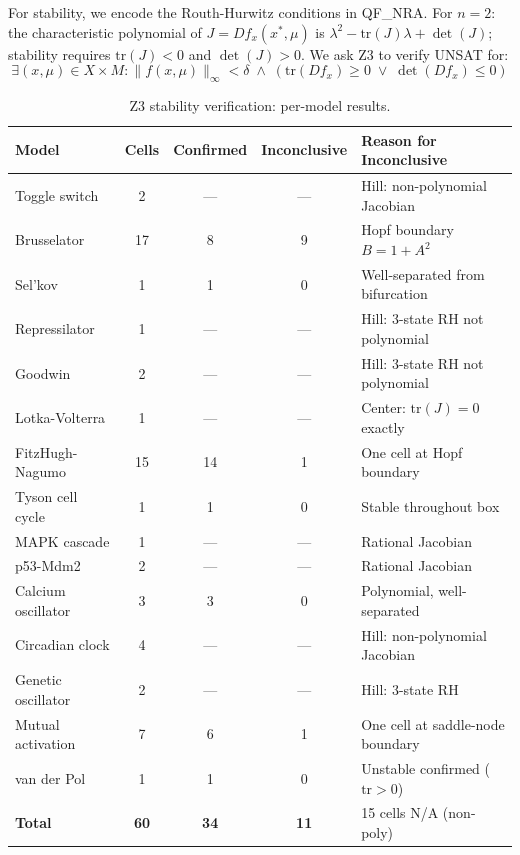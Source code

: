 \documentclass[11pt]{article}
\newcommand{\norm}[1]{\|#1\|}
\begin{document}
For stability, we encode the Routh-Hurwitz conditions in QF\_NRA.
For $n = 2$: the characteristic polynomial of $J = Df_x(x^*, \mu)$ is $\lambda^2 - \mathrm{tr}(J)\lambda + \det(J)$; stability requires $\mathrm{tr}(J) < 0$ and $\det(J) > 0$.
We ask Z3 to verify UNSAT for:
\[
\exists (x, \mu) \in X \times M : \norm{f(x, \mu)}_\infty < \delta \;\wedge\; (\mathrm{tr}(Df_x) \geq 0 \;\lor\; \det(Df_x) \leq 0)
\]

\begin{table}[h]
\centering
\caption{Z3 stability verification: per-model results.}
\label{tab:z3-stability}
\small
\begin{tabular}{@{}lcccl@{}}
\toprule
Model & Cells & Confirmed & Inconclusive & Reason for Inconclusive \\
\midrule
Toggle switch      & 2  & ---  & ---  & Hill: non-polynomial Jacobian \\
Brusselator        & 17 & 8    & 9    & Hopf boundary $B = 1 + A^2$ \\
Sel'kov            & 1  & 1    & 0    & Well-separated from bifurcation \\
Repressilator      & 1  & ---  & ---  & Hill: 3-state RH not polynomial \\
Goodwin            & 2  & ---  & ---  & Hill: 3-state RH not polynomial \\
Lotka-Volterra     & 1  & ---  & ---  & Center: $\mathrm{tr}(J) = 0$ exactly \\
FitzHugh-Nagumo    & 15 & 14   & 1    & One cell at Hopf boundary \\
Tyson cell cycle   & 1  & 1    & 0    & Stable throughout box \\
MAPK cascade       & 1  & ---  & ---  & Rational Jacobian \\
p53-Mdm2           & 2  & ---  & ---  & Rational Jacobian \\
Calcium oscillator & 3  & 3    & 0    & Polynomial, well-separated \\
Circadian clock    & 4  & ---  & ---  & Hill: non-polynomial Jacobian \\
Genetic oscillator & 2  & ---  & ---  & Hill: 3-state RH \\
Mutual activation  & 7  & 6    & 1    & One cell at saddle-node boundary \\
van der Pol        & 1  & 1    & 0    & Unstable confirmed ($\mathrm{tr} > 0$) \\
\midrule
\textbf{Total}     & \textbf{60} & \textbf{34} & \textbf{11} & 15 cells N/A (non-poly) \\
\bottomrule
\end{tabular}
\end{table}
\end{document}
